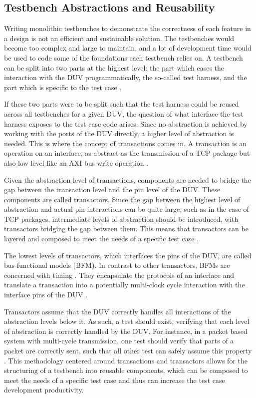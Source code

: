 \documentclass[11pt,a4paper]{report}
\begin{document}
\subsection{Testbench Abstractions and Reusability} %

Writing monolithic testbenches to demonstrate the correctness of each feature
in a design is not an efficient and sustainable solution. The testbenches would become too complex and large to
maintain, and a lot of development time would be
used to code some of the foundations each testbench relies on. A testbench can be split into two parts at the highest
level: the part which eases the interaction with the DUV programmatically, the so-called test harness, and the part
which is specific to the test case \cite[Ch. 6]{bergeron2012writing}.

If these two parts were to be split such that the test harness could be reused across all testbenches for a given
DUV, the question of what interface the test harness exposes to the test case code arises. Since no abstraction is
achieved by working with the ports of the DUV directly, a higher level of abstraction is needed. This is where the
concept of transactions comes in. A transaction is an operation on an interface, as abstract as the transmission of a
TCP package but also low level like an AXI bus write operation \cite[Ch. 1]{bergeron2005verification}.

Given the abstraction level of transactions, components are needed to bridge the gap between the transaction level
and the pin level of the DUV. These components are called transactors. Since the gap between the highest level of
abstraction and actual pin interactions can be quite large, such as in the case of TCP packages, intermediate levels
of abstraction should be introduced, with transactors bridging the gap between them. This means that transactors can
be layered and composed to meet the needs of a specific test case \cite[Ch. 4]{bergeron2012writing}.

The lowest levels of transactors, which interfaces the pins of the DUV, are called bus-functional models (BFM). In
contrast to other transactors, BFMs are concerned with timing \cite[Ch. 4]{bergeron2012writing}. They encapsulate the
protocols of an interface and translate a transaction into a potentially multi-clock cycle interaction with the
interface pins of the DUV \cite[Ch. 3]{salemi2013uvm}.

Transactors assume that the DUV correctly handles all interactions of the abstraction levels below it. As such, a
test should exist, verifying that each level of abstraction is correctly handled by the DUV. For instance, in a
packet based system with multi-cycle transmission, one test should verify that parts of a packet are correctly sent,
such that all other test can safely assume this property \cite[Ch. 6]{bergeron2012writing}. This methodology centered
around transactions and transactors allows for the structuring of a testbench into reusable components, which can be
composed to meet the needs of a specific test case and thus can increase the test case development productivity.
\end{document}
